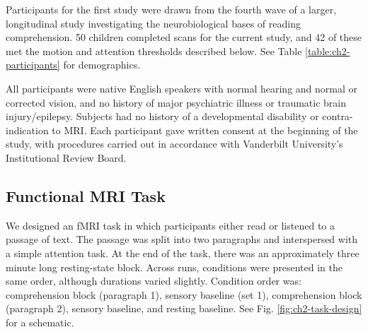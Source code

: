Participants for the first study were drawn from the fourth wave of a larger, longitudinal study investigating the neurobiological bases of reading comprehension. 50 children completed scans for the current study, and 42 of these met the motion and attention thresholds described below. See Table \ref{table:ch2-participants} for demographics. 

All participants were native English speakers with normal hearing and normal or corrected vision, and no history of major psychiatric illness or traumatic brain injury/epilepsy. Subjects had no history of a developmental disability or contra-indication to MRI.  Each participant gave written consent at the beginning of the study, with procedures carried out in accordance with Vanderbilt University’s Institutional Review Board.

\begin{table}
	\scriptsize
	\renewcommand{\tabcolsep}{0.09cm}
	\centering
	
	\caption[Participant demographics for Study 1.]
	\label{table:ch2-participants}
\end{table}


\subsection{Functional MRI Task}

We designed an fMRI task in which participants either read or listened to a passage of text. The passage was split into two paragraphs and interspersed with a simple attention task. At the end of the task, there was an approximately three minute long resting-state block. Across runs, conditions were presented in the same order, although durations varied slightly. Condition order was: comprehension block (paragraph 1), sensory baseline (set 1), comprehension block (paragraph 2), sensory baseline, and resting baseline. See Fig. \ref{fig:ch2-task-design} for a schematic.

